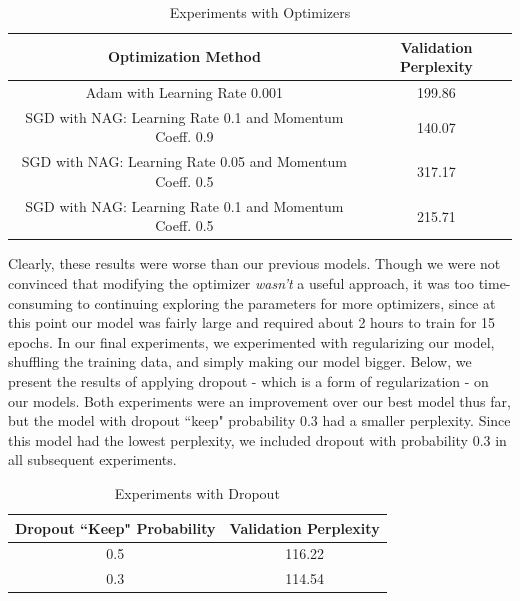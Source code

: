 \documentclass[a4paper]{article}
\begin{document}
\begin{table}[h!]
\centering
\begin{tabular}{|c | c|} 
 \hline
Optimization Method & Validation Perplexity \\ \hline \hline
Adam with Learning Rate 0.001 & 199.86 \\ \hline
SGD with NAG: Learning Rate 0.1 and Momentum Coeff. 0.9 & 140.07\\ \hline
SGD with NAG: Learning Rate 0.05 and Momentum Coeff. 0.5 & 317.17 \\ \hline
SGD with NAG: Learning Rate 0.1 and Momentum Coeff. 0.5 &215.71 \\ \hline
\end{tabular}
\caption{Experiments with Optimizers}
\label{table:1}
\end{table}
Clearly, these results were worse than our previous models. Though we were not convinced that modifying the optimizer \textit{wasn't} a useful approach, it was too time-consuming to continuing exploring the parameters for more optimizers, since at this point our model was fairly large and required about 2 hours to train for 15 epochs. 
\newline
\newline
In our final experiments, we experimented with regularizing our model, shuffling the training data, and simply making our model bigger. Below, we present the results of applying dropout - which is a form of regularization - on our models. Both experiments were an improvement over our best model thus far, but the model with dropout ``keep" probability 0.3 had a smaller perplexity. Since this model had the lowest perplexity, we included dropout with probability 0.3 in all subsequent experiments.

\begin{table}[h!]
\centering
\begin{tabular}{|c | c|} 
 \hline
Dropout ``Keep" Probability & Validation Perplexity \\ \hline \hline
0.5 & 116.22 \\ \hline
0.3 & 114.54\\ \hline
\end{tabular}
\caption{Experiments with Dropout}
\label{table:1}
\end{table}
\end{document}
